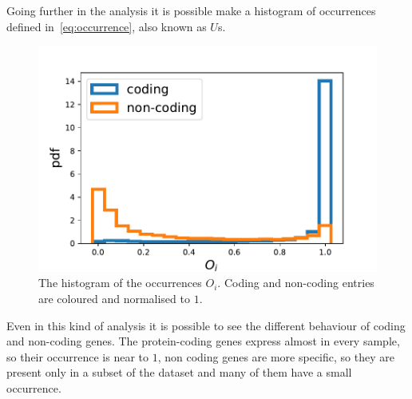 Going further in the analysis it is possible make a histogram of occurrences defined in~\ref{eq:occurrence}, also known as $U$s.
\begin{figure}[htb!]
    \centering
    \includegraphics[width=0.9\linewidth]{pictures/structure/gtex/U_gtex_cnc.pdf}
    \caption{The histogram of the occurrences $O_i$. Coding and non-coding entries are coloured and normalised to $1$.}
    \label{fig:structure/gtex/U_cnc}
\end{figure}
Even in this kind of analysis it is possible to see the different behaviour of coding and non-coding genes. The protein-coding genes express almost in every sample, so their occurrence is near to $1$, non coding genes are more specific, so they are present only in a subset of the dataset and many of them have a small occurrence.
